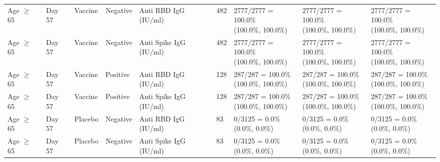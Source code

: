 \documentclass[]{book}
\theoremstyle{definition}
\theoremstyle{definition}
\theoremstyle{definition}
\newcommand{\1}{\mathbbm{1}}
\begin{document}
\begin{landscape}
\begin{ThreePartTable}
\begin{longtable}[t]{>{\raggedright\arraybackslash}p{2.7cm}llllllll}
\hspace{1em}Age $\geq$ 65 & Day 57 & Vaccine & Negative & Anti RBD IgG (IU/ml) & 482 & \makecell[l]{2777/2777 = 100.0\%\\(100.0\%, 100.0\%)} & \makecell[l]{2777/2777 = 100.0\%\\(100.0\%, 100.0\%)} & \makecell[l]{2777/2777 = 100.0\%\\(100.0\%, 100.0\%)}\\
\hspace{1em}Age $\geq$ 65 & Day 57 & Vaccine & Negative & Anti Spike IgG (IU/ml) & 482 & \makecell[l]{2777/2777 = 100.0\%\\(100.0\%, 100.0\%)} & \makecell[l]{2777/2777 = 100.0\%\\(100.0\%, 100.0\%)} & \makecell[l]{2777/2777 = 100.0\%\\(100.0\%, 100.0\%)}\\
\hspace{1em}Age $\geq$ 65 & Day 57 & Vaccine & Positive & Anti RBD IgG (IU/ml) & 128 & \makecell[l]{287/287 = 100.0\%\\(100.0\%, 100.0\%)} & \makecell[l]{287/287 = 100.0\%\\(100.0\%, 100.0\%)} & \makecell[l]{287/287 = 100.0\%\\(100.0\%, 100.0\%)}\\
\hspace{1em}Age $\geq$ 65 & Day 57 & Vaccine & Positive & Anti Spike IgG (IU/ml) & 128 & \makecell[l]{287/287 = 100.0\%\\(100.0\%, 100.0\%)} & \makecell[l]{287/287 = 100.0\%\\(100.0\%, 100.0\%)} & \makecell[l]{287/287 = 100.0\%\\(100.0\%, 100.0\%)}\\
\hspace{1em}Age $\geq$ 65 & Day 57 & Placebo & Negative & Anti RBD IgG (IU/ml) & 83 & \makecell[l]{0/3125 = 0.0\%\\(0.0\%, 0.0\%)} & \makecell[l]{0/3125 = 0.0\%\\(0.0\%, 0.0\%)} & \makecell[l]{0/3125 = 0.0\%\\(0.0\%, 0.0\%)}\\
\hspace{1em}Age $\geq$ 65 & Day 57 & Placebo & Negative & Anti Spike IgG (IU/ml) & 83 & \makecell[l]{0/3125 = 0.0\%\\(0.0\%, 0.0\%)} & \makecell[l]{0/3125 = 0.0\%\\(0.0\%, 0.0\%)} & \makecell[l]{0/3125 = 0.0\%\\(0.0\%, 0.0\%)}\\

\end{longtable}
\end{ThreePartTable}
\end{landscape}
\end{document}
